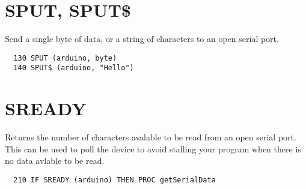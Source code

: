 \section{SPUT, SPUT\$}
Send a single byte of data, or a string of characters to an open serial port.
\begin{verbatim}
  130 SPUT (arduino, byte)
  140 SPUT$ (arduino, "Hello")
\end{verbatim}

\section{SREADY}
Returns the number of characters avalable to be read from an open serial
port. This can be used to poll the device to avoid stalling your program
when there is no data avlable to be read.
\begin{verbatim}
  210 IF SREADY (arduino) THEN PROC getSerialData
\end{verbatim}
